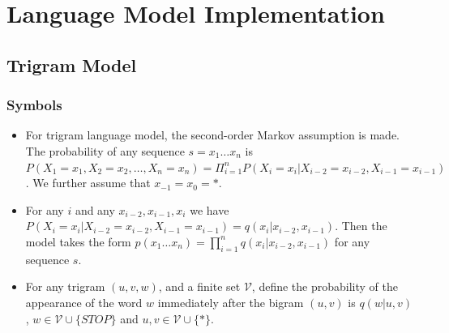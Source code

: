 \section{\textbf{Language Model Implementation}}

\subsection{\textbf{Trigram Model}}

\subsubsection{\textbf{Symbols}}

\begin{itemize}

\item For trigram language model, the second-order Markov assumption is made. The probability of any sequence 
$s=x_1\dots x_n$ is $P(X_1=x_1, X_2=x_2, \dots, X_n=x_n)=\Pi_{i=1}^{n} P\left(X_{i}=x_{i} | X_{i-2}=x_{i-2}, X_{i-1}=x_{i-1}\right)$.
We further assume that $x_{-1}=x_{0}=*$.

\item For any $i$ and any $x_{i-2}, x_{i-1}, x_{i}$ we have $P\left(X_{i}=x_{i} | X_{i-2}=x_{i-2}, X_{i-1}=x_{i-1}\right)=q\left(x_{i} | x_{i-2}, x_{i-1}\right)$.
Then the model takes the form $p\left(x_{1} \ldots x_{n}\right)=\prod_{i=1}^{n} q\left(x_{i} | x_{i-2}, x_{i-1}\right)$ for any sequence $s$.
\item For any trigram $(u, v, w)$, and a finite set $\mathcal{V}$, define the probability of the appearance of the word $w$ immediately after the bigram $(u,v)$ is $q(w|u,v)$, $w \in \mathcal{V} \cup\{S T O P\}$ and $u, v \in \mathcal{V} \cup\{*\}$.
\end{itemize}

